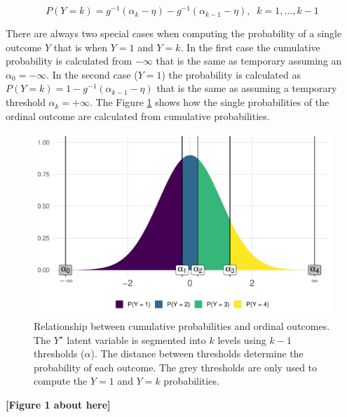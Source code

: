 \documentclass[
  man,floatsintext]{apa6}
\begin{document}
\begin{equation}
P(Y = k) = g^{-1}(\alpha_k - \eta) -  g^{-1}(\alpha_{k - 1} - \eta), \;\;k = 1, \dots, k - 1
\label{eq:prob-cum-model2}
\end{equation}

There are always two special cases when computing the probability of a single outcome \(Y\) that is when \(Y = 1\) and \(Y = k\). In the first case the cumulative probability is calculated from \(-\infty\) that is the same as temporary assuming an \(\alpha_0 = -\infty\). In the second case (\(Y = 1\)) the probability is calculated as \(P(Y = k) = 1 - g^{-1}(\alpha_{k - 1} - \eta)\) that is the same as assuming a temporary threshold \(\alpha_k = +\infty\). The Figure \ref{fig:fig-explain-cumulative} shows how the single probabilities of the ordinal outcome are calculated from cumulative probabilities.

\scriptsize

\begin{figure}

{\centering \includegraphics[width=1\linewidth]{paper_files/figure-latex/fig-explain-cumulative-1} 

}

\caption{Relationship between cumulative probabilities and ordinal outcomes. The \(Y^\star\) latent variable is segmented into \(k\) levels using \(k - 1\) thresholds (\(\alpha\)). The distance between thresholds determine the probability of each outcome. The grey thresholds are only used to compute the \(Y = 1\) and \(Y = k\) probabilities.}\label{fig:fig-explain-cumulative}
\end{figure}

\begin{center}\textbf{[Figure 1 about here]} \end{center}
\end{document}
